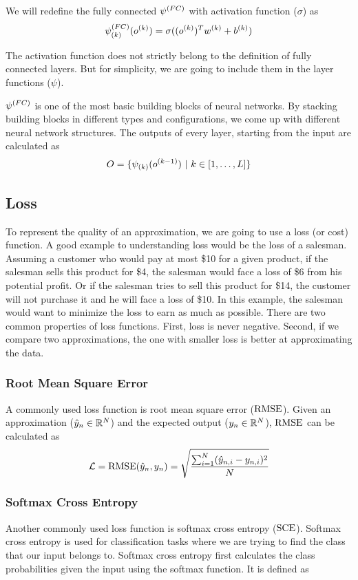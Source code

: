 We will redefine the fully connected $\psi^{(FC)}$ with activation function ($\sigma$) as
$$ \psi^{(FC)}_{(k)}(o^{(k)}) = \sigma((o^{(k)})^Tw^{(k)} + b^{(k)})$$

The activation function does not strictly belong to the definition of fully connected layers. But for simplicity, we are going to include them in the layer functions ($\psi$).

$\psi^{(FC)}$ is one of the most basic building blocks of neural networks. By stacking building blocks in different types and configurations, we come up with different neural network structures. The outputs of every layer, starting from the input are calculated as
$$ \all\outputvar = \{\lfk{k}(\ok{k-1}) \ | \  k \in [1, \ldots, \num\layer] \} $$
\subsection{Loss}

To represent the quality of an approximation, we are going to use a loss (or cost) function. A good example to understanding loss would be the loss of a salesman. Assuming a customer who would pay at most \$10 for a given product, if the salesman sells this product for \$4, the salesman would face a loss of \$6 from his potential profit. Or if the salesman tries to sell this product for \$14, the customer will not purchase it and he will face a loss of \$10. In this example, the salesman would want to minimize the loss to earn as much as possible. There are two common properties of loss functions. First, loss is never negative. Second, if we compare two approximations, the one with smaller loss is better at approximating the data.

\subsubsection{Root Mean Square Error}
A commonly used loss function is root mean square error ($\textrm{RMSE}$). Given an approximation ($\hat{y}_{n} \in \mathbb{R}^{N}$) and the expected output ($y_{n} \in \mathbb{R}^{N}$), $\textrm{RMSE}$ can be calculated as
\begin{equation*}
\mathcal{L} = \textrm{RMSE}(\hat{y}_{n}, y_{n}) = \sqrt{\frac{\sum^N_{i=1} (\hat{y}_{n,i} - y_{n,i})^2 }{N}}
\end{equation*}

\subsubsection{Softmax Cross Entropy}
Another commonly used loss function is softmax cross entropy ($\textrm{SCE}$). Softmax cross entropy is used for classification tasks where we are trying to find the class that our input belongs to. Softmax cross entropy first calculates the class probabilities given the input using the softmax function. It is defined as

